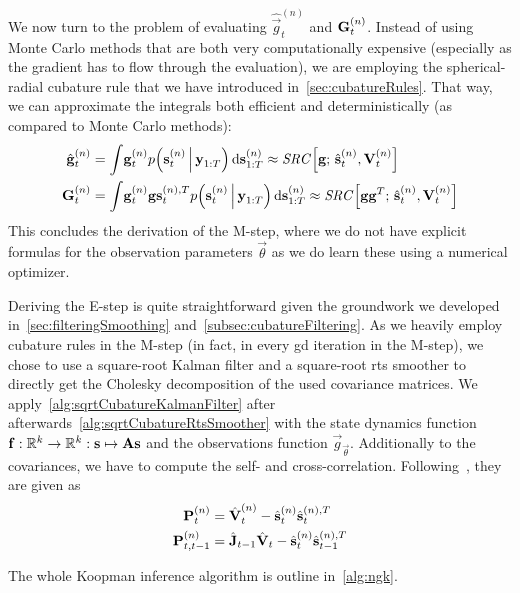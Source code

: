 	We now turn to the problem of evaluating \( \hat{\vec{g}}_t^{(n)} \) and \( \boldsymbol{\mathrm{G}}_t^{(n)} \). Instead of using Monte Carlo methods that are both very computationally expensive (especially as the gradient has to flow through the evaluation), we are employing the spherical-radial cubature rule that we have introduced in~\autoref{sec:cubatureRules}. That way, we can approximate the integrals both efficient and deterministically (as compared to Monte Carlo methods):
	\begin{align}
		\hat{\boldsymbol{\mathrm{g}}}_t^{(n)} &= \int\! \boldsymbol{\mathrm{g}}_t^{(n)} p\Big(\boldsymbol{\mathrm{s}}_t^{(n)} \,\Big\vert\, \boldsymbol{\mathrm{y}}_{1:T}\Big) \dd{\boldsymbol{\mathrm{s}}_{1:T}^{(n)}} \approx \mathit{SRC}\Big[\boldsymbol{\mathrm{g}};\, \hat{\boldsymbol{\mathrm{s}}}_t^{(n)}, \boldsymbol{\mathrm{V}}_t^{(n)}\Big]  \label{eq:ngkgeval} \\
		\boldsymbol{\mathrm{G}}_t^{(n)}       &= \int\! \boldsymbol{\mathrm{g}}_t^{(n)} \boldsymbol{\mathrm{g}}\boldsymbol{\mathrm{s}}_t^{(n), T} p\Big(\boldsymbol{\mathrm{s}}_t^{(n)} \,\Big\vert\, \boldsymbol{\mathrm{y}}_{1:T} \Big) \dd{\boldsymbol{\mathrm{s}}_{1:T}^{(n)}} \approx \mathit{SRC}\Big[\boldsymbol{\mathrm{g}} \boldsymbol{\mathrm{g}}^T;\, \hat{\boldsymbol{\mathrm{s}}}_t^{(n)}, \boldsymbol{\mathrm{V}}_t^{(n)}\Big]  \label{eq:ngkGeval}
	\end{align}
	This concludes the derivation of the M-step, where we do not have explicit formulas for the observation parameters \(\vec{\theta}\) as we do learn these using a numerical optimizer.

	Deriving the E-step is quite straightforward given the groundwork we developed in~\autoref{sec:filteringSmoothing} and~\autoref{subsec:cubatureFiltering}. As we heavily employ cubature rules in the M-step (in fact, in every \ac{gd} iteration in the M-step), we chose to use a square-root Kalman filter and a square-root \ac{rts} smoother to directly get the Cholesky decomposition of the used covariance matrices. We apply~\autoref{alg:sqrtCubatureKalmanFilter} after afterwards~\autoref{alg:sqrtCubatureRtsSmoother} with the state dynamics function \( \boldsymbol{\mathrm{f}} : \mathbb{R}^k \to \mathbb{R}^k : \boldsymbol{\mathrm{s}} \mapsto \boldsymbol{\mathrm{A}} \boldsymbol{\mathrm{s}} \) and the observations function \( \vec{g}_{\vec{\theta}} \). Additionally to the covariances, we have to compute the self- and cross-correlation. Following~\cite{minkaHiddenMarkovModels1999}, they are given as
	\begin{align*}
		\boldsymbol{\mathrm{P}}_t^{(n)} &= \hat{\boldsymbol{\mathrm{V}}}_t^{(n)} - \hat{\boldsymbol{\mathrm{s}}}_t^{(n)} \hat{\boldsymbol{\mathrm{s}}}_t^{(n), T} \\
		\boldsymbol{\mathrm{P}}_{t, t - 1}^{(n)} &= \hat{\boldsymbol{\mathrm{J}}}_{t - 1} \hat{\boldsymbol{\mathrm{V}}}_t - \hat{\boldsymbol{\mathrm{s}}}_{t}^{(n)} \hat{\boldsymbol{\mathrm{s}}}_{t - 1}^{(n), T}
	\end{align*}

	The whole Koopman inference algorithm is outline in~\autoref{alg:ngk}.


